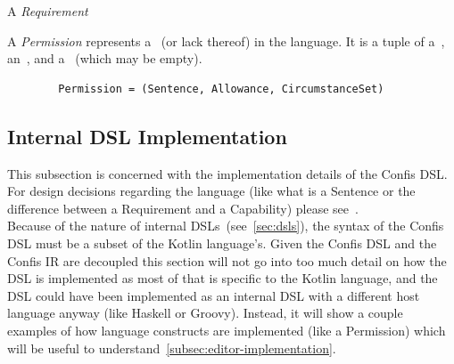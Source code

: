 \begin{definition}[Action]
    \label{def:action}
\end{definition}

\begin{definition}[Capability]
    \label{def:capability}
\end{definition}

\begin{definition}[Sentence]
    \label{def:sentence}
\end{definition}

\begin{definition}[Requirement]
    \label{def:requirement} A \emph{Requirement}
\end{definition}

\begin{definition}[Allowance]
    \label{def:allowance}
\end{definition}

\begin{definition}
    \label{def:circumstanceSet}
\end{definition}

\begin{definition}[Permission]
    \label{def:permission} A \emph{Permission} represents a~ (or lack thereof) in the language.
    It is a tuple of a~, an~, and a~ (which may be empty).
    \begin{verbatim}
        Permission = (Sentence, Allowance, CircumstanceSet)
    \end{verbatim}


\end{definition}

\subsection{Internal DSL Implementation}\label{subsec:dsl-implementation}

This subsection is concerned with the implementation details of the Confis DSL.
For design decisions regarding the language (like what is a Sentence or the difference between a Requirement and a Capability) please see~.\\

Because of the nature of internal DSLs~(see~\autoref{sec:dsls}), the syntax of the Confis DSL must be a subset of the Kotlin language's.
Given the Confis DSL and the Confis IR are decoupled this section will not go into too much detail on how the DSL is implemented as most of that is specific to the Kotlin language, and the DSL could have been implemented as an internal DSL with a different host language anyway (like Haskell or Groovy).
Instead, it will show a couple examples of how language constructs are implemented (like a Permission) which will be useful to understand~\autoref{subsec:editor-implementation}.

